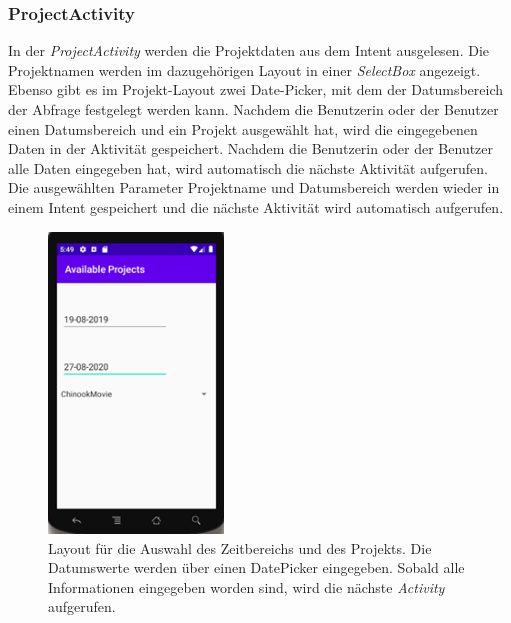 \subsubsection{ProjectActivity}
In der \textit{ProjectActivity} werden die Projektdaten aus dem Intent ausgelesen. Die Projektnamen werden im dazugehörigen Layout in einer \textit{SelectBox} angezeigt. Ebenso gibt es im Projekt-Layout zwei Date-Picker, mit dem der Datumsbereich der Abfrage festgelegt werden kann. Nachdem die Benutzerin oder der Benutzer einen Datumsbereich und ein Projekt ausgewählt hat, wird die eingegebenen Daten in der Aktivität gespeichert. Nachdem die Benutzerin oder der Benutzer alle Daten eingegeben hat, wird automatisch die nächste Aktivität aufgerufen. Die ausgewählten Parameter Projektname und Datumsbereich werden wieder in einem Intent gespeichert und die nächste Aktivität wird automatisch aufgerufen.
\begin{figure}[tp]
  \centering
  \includegraphics[height=8cm]{images/anroidProjectScreen.PNG}
 \caption[Layout für die Auswahl des Zeitbereichs und des Projekts]{Layout für die Auswahl des Zeitbereichs und des Projekts. Die Datumswerte werden über einen DatePicker eingegeben. Sobald alle Informationen eingegeben worden sind, wird die nächste \textit{Activity} aufgerufen.}
  \label{fig:findingsInIDE}
\end{figure}
